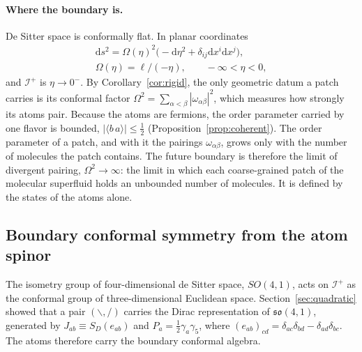 \documentclass[reprint,aps,prd,amsmath,amssymb,superscriptaddress,nofootinbib,floatfix]{revtex4-2}
\theoremstyle{plain}
\theoremstyle{definition}
\theoremstyle{remark}
\newcommand{\Lat}{\ensuremath{/}}                 %
\newcommand{\Rat}{\ensuremath{\backslash}}        %
\newcommand{\dd}{\mathrm{d}}
\begin{document}
\paragraph*{Where the boundary is.} De Sitter space is conformally flat. In planar coordinates
\begin{equation}
\begin{gathered}
\dd s^2=\Omega(\eta)^2\big(-\dd\eta^2+\delta_{ij}\dd x^i\dd x^j\big),\\
\Omega(\eta)=\ell/(-\eta),\qquad -\infty<\eta<0,
\end{gathered}
\label{eq:dsplanar}
\end{equation}
and $\mathcal{I}^+$ is $\eta\to0^-$. By Corollary~\ref{cor:rigid}, the only geometric datum a patch carries is its conformal
factor $\Omega^2=\sum_{\alpha<\beta}|\omega_{\alpha\beta}|^2$, which measures how strongly its atoms pair. Because the atoms are
fermions, the order parameter carried by one flavor is bounded, $|\langle b\,a\rangle|\le\tfrac12$
(Proposition~\ref{prop:coherent}). The order parameter of a patch, and with it the pairings $\omega_{\alpha\beta}$, grows only with
the number of molecules the patch contains. The future boundary is therefore the limit of divergent pairing,
$\Omega^2\to\infty$: the limit in which each coarse-grained patch of the molecular superfluid holds an unbounded number of
molecules. It is defined by the states of the atoms alone.

\subsection{Boundary conformal symmetry from the atom spinor}

The isometry group of four-dimensional de Sitter space, $SO(4,1)$, acts on $\mathcal{I}^+$ as the conformal group of
three-dimensional Euclidean space. Section~\ref{sec:quadratic} showed that a pair $(\Rat,\Lat)$ carries the Dirac
representation of $\mathfrak{so}(4,1)$, generated by $J_{ab}\equiv S_D(e_{ab})$ and $P_a=\tfrac12\gamma_a\gamma_5$, where
$(e_{ab})_{cd}=\delta_{ac}\delta_{bd}-\delta_{ad}\delta_{bc}$. The atoms therefore carry the boundary conformal algebra.
\end{document}
